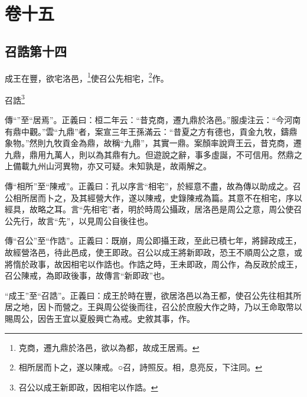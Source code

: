 

\chapter{卷十五}


\section{召誥第十四}


成王在豐，欲宅洛邑，\footnote{克商，遷九鼎於洛邑，欲以為都，故成王居焉。}使召公先相宅，\footnote{相所居而卜之，遂以陳戒。○召，詩照反。相，息亮反，下注同。}作。

召誥\footnote{召公以成王新即政，因相宅以作誥。}


{\noindent\zhuan{}\fzbyks 傳“”至“居焉”。正義曰：桓二年云：“昔克商，遷九鼎於洛邑。”服虔注云：“今河南有鼎中觀。”雲“九鼎”者，案宣三年王孫滿云：“昔夏之方有德也，貢金九牧，鑄鼎象物。”然則九牧貢金為鼎，故稱“九鼎”，其實一鼎。案顏率說齊王云，昔克商，遷九鼎，鼎用九萬人，則以為其鼎有九。但遊說之辭，事多虛誕，不可信用。然鼎之上備載九州山河異物，亦又可疑。未知孰是，故兩解之。 \par}

{\noindent\zhuan{}\fzbyks 傳“相所”至“陳戒”。正義曰：孔以序言“相宅”，於經意不盡，故為傳以助成之。召公相所居而卜之，及其經營大作，遂以陳戒，史錄陳戒為篇。其意不在相宅，序以經具，故略之耳。言“先相宅”者，明於時周公攝政，居洛邑是周公之意，周公使召公先行，故言“先”，以見周公自後往也。 \par}

{\noindent\zhuan{}\fzbyks 傳“召公”至“作誥”。正義曰：既崩，周公即攝王政，至此已積七年，將歸政成王，故經營洛邑，待此邑成，使王即政。召公以成王將新即政，恐王不順周公之意，或將惰於政事，故因相宅以作誥也。作誥之時，王未即政，周公作，為反政於成王，召公陳戒，為即政後事，故傳言“新即政”也。 \par}

{\noindent\shu{}\fzkt “成王”至“召誥”。正義曰：成王於時在豐，欲居洛邑以為王都，使召公先往相其所居之地，因卜而營之。王與周公從後而往，召公於庶殷大作之時，乃以王命取幣以賜周公，因告王宜以夏殷興亡為戒。史敘其事，作。 \par}

